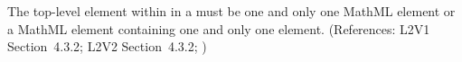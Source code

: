 The top-level element within  in a \FunctionDefinition must be
one and only one MathML  element or a MathML
 element containing one and only one 
element.  (References: L2V1 Section~4.3.2; L2V2 Section~4.3.2;
)
